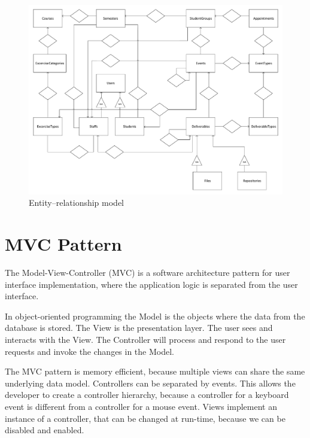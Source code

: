 
\begin{figure}[!htbp]
	\includegraphics[width=0.85\textheight, angle=90]{figures/ER.pdf}
	\caption[Entity–relationship model]{Entity–relationship model}
	\label{fig:er}
\end{figure}

\newpage
\section{MVC Pattern}
\label{mvc}

The Model-View-Controller (MVC) is a software architecture pattern for user interface implementation, where the application logic is separated from the user interface.

In object-oriented programming the Model is the objects where the data from the database is stored. The View is the presentation layer. The user sees and interacts with the View. The Controller will process and respond to the user requests and invoke the changes in the Model. 

The MVC pattern is memory efficient, because multiple views can share the same underlying data model. Controllers can be separated by events. This allows the developer to create a controller hierarchy, because a controller for a keyboard event is different from a controller for a mouse event. Views implement an instance of a controller, that can be changed at run-time, because we can be disabled and enabled.


